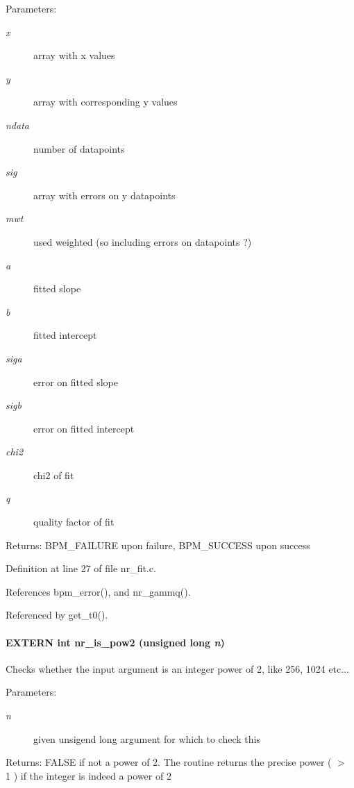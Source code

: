 \begin{Desc}
\item[Parameters:]
\begin{description}
\item[{\em x}]array with x values \item[{\em y}]array with corresponding y values \item[{\em ndata}]number of datapoints \item[{\em sig}]array with errors on y datapoints \item[{\em mwt}]used weighted (so including errors on datapoints ?) \item[{\em a}]fitted slope \item[{\em b}]fitted intercept \item[{\em siga}]error on fitted slope \item[{\em sigb}]error on fitted intercept \item[{\em chi2}]chi2 of fit \item[{\em q}]quality factor of fit\end{description}
\end{Desc}
\begin{Desc}
\item[Returns:]BPM\_\-FAILURE upon failure, BPM\_\-SUCCESS upon success \end{Desc}


Definition at line 27 of file nr\_\-fit.c.

References bpm\_\-error(), and nr\_\-gammq().

Referenced by get\_\-t0().
\paragraph[nr\_\-is\_\-pow2]{\setlength{\rightskip}{0pt plus 5cm}EXTERN int nr\_\-is\_\-pow2 (unsigned long {\em n})}\hfill\label{group__nr_g9716ccdd235eee39ac7843f102f45e2d}


Checks whether the input argument is an integer power of 2, like 256, 1024 etc...

\begin{Desc}
\item[Parameters:]
\begin{description}
\item[{\em n}]given unsigend long argument for which to check this\end{description}
\end{Desc}
\begin{Desc}
\item[Returns:]FALSE if not a power of 2. The routine returns the precise power ( $>$ 1 ) if the integer is indeed a power of 2 \end{Desc}


